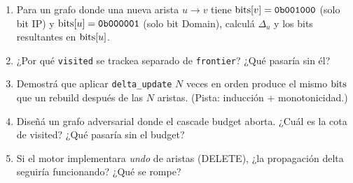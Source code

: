\begin{ejercicios}
\begin{enumerate}
    \item \starred{} Para un grafo donde una nueva arista
    \(u \to v\) tiene \(\mathrm{bits}[v] = \texttt{0b001000}\) (solo bit
    IP) y \(\mathrm{bits}[u] = \texttt{0b000001}\) (solo bit Domain),
    calculá \(\Delta_u\) y los bits resultantes en \(\mathrm{bits}[u]\).

    \item ¿Por qué \texttt{visited} se trackea separado de
    \texttt{frontier}? ¿Qué pasaría sin él?

    \item \starred{} Demostrá que aplicar
    \texttt{delta\_update} \(N\) veces en orden produce
    el mismo \(\mathrm{bits}\) que un rebuild después de las \(N\)
    aristas. (Pista: inducción + monotonicidad.)

    \item Diseñá un grafo adversarial donde el cascade budget
    aborta. ¿Cuál es la cota de visited? ¿Qué pasaría sin el
    budget?

    \item Si el motor implementara \emph{undo} de aristas
    (DELETE), ¿la propagación delta seguiría funcionando? ¿Qué se
    rompe?
\end{enumerate}
\end{ejercicios}
